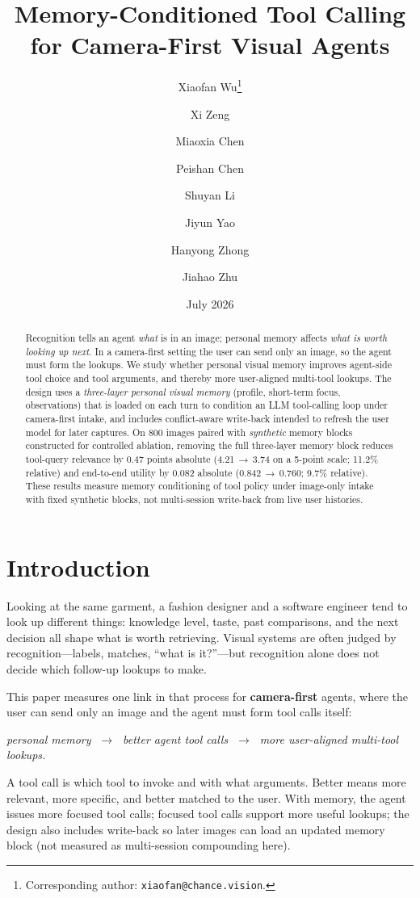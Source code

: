 \documentclass[11pt,a4paper]{article}
\title{\textbf{Memory-Conditioned Tool Calling\\for Camera-First Visual Agents}}
\author[1]{Xiaofan Wu\thanks{Corresponding author: \texttt{xiaofan@chance.vision}.}}
\author[1]{Xi Zeng}
\author[1]{Miaoxia Chen}
\author[1]{Peishan Chen}
\author[1]{Shuyan Li}
\author[1]{Jiyun Yao}
\author[1]{Hanyong Zhong}
\author[1]{Jiahao Zhu}
\affil[1]{Chance AI}
\date{July 2026}
\begin{document}
\maketitle

\begin{abstract}
Recognition tells an agent \emph{what} is in an image; personal memory affects \emph{what is worth looking up next}. In a camera-first setting the user can send only an image, so the agent must form the lookups. We study whether personal visual memory improves agent-side tool choice and tool arguments, and thereby more user-aligned multi-tool lookups. The design uses a \emph{three-layer personal visual memory} (profile, short-term focus, observations) that is loaded on each turn to condition an LLM tool-calling loop under camera-first intake, and includes conflict-aware write-back intended to refresh the user model for later captures. On 800 images paired with \emph{synthetic} memory blocks constructed for controlled ablation, removing the full three-layer memory block reduces tool-query relevance by 0.47 points absolute (4.21\,$\to$\,3.74 on a 5-point scale; 11.2\% relative) and end-to-end utility by 0.082 absolute (0.842\,$\to$\,0.760; 9.7\% relative). These results measure memory conditioning of tool policy under image-only intake with fixed synthetic blocks, not multi-session write-back from live user histories.
\end{abstract}

\section{Introduction}

Looking at the same garment, a fashion designer and a software engineer tend to look up different things: knowledge level, taste, past comparisons, and the next decision all shape what is worth retrieving. Visual systems are often judged by recognition---labels, matches, ``what is it?''---but recognition alone does not decide which follow-up lookups to make.

This paper measures one link in that process for \textbf{camera-first} agents, where the user can send only an image and the agent must form tool calls itself:
\begin{center}
\emph{personal memory $\;\rightarrow\;$ better agent tool calls $\;\rightarrow\;$ more user-aligned multi-tool lookups.}
\end{center}
A tool call is which tool to invoke and with what arguments. Better means more relevant, more specific, and better matched to the user. With memory, the agent issues more focused tool calls; focused tool calls support more useful lookups; the design also includes write-back so later images can load an updated memory block (not measured as multi-session compounding here).
\end{document}
